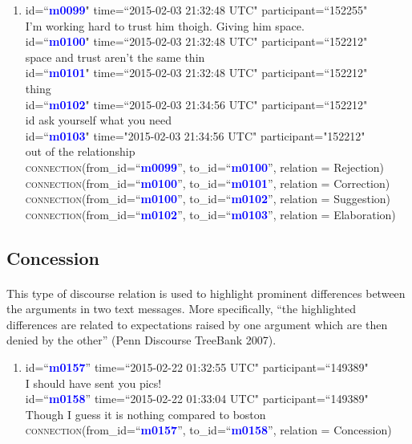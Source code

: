 \documentclass{article}
\begin{document}
\begin{enumerate}[resume]
\item id=``\textbf{\textcolor{blue}{m0099}}" time=``2015-02-03 21:32:48 UTC" participant=``152255"\\
I'm working hard to trust him thoigh. Giving him space. \\
id=``\textbf{\textcolor{blue}{m0100}}" time=``2015-02-03 21:32:48 UTC" participant=``152212" \\
space and trust aren’t the same thin \\
id=``\textbf{\textcolor{blue}{m0101}}" time=``2015-02-03 21:32:48 UTC" participant=``152212" \\
thing \\
id=``\textbf{\textcolor{blue}{m0102}}" time=``2015-02-03 21:34:56 UTC" participant=``152212" \\
id ask yourself what you need\\
id=``\textbf{\textcolor{blue}{m0103}}" time="2015-02-03 21:34:56 UTC" participant="152212"\\
out of the relationship\\
\textsc{connection}(from\_id=``\textbf{\textcolor{blue}{m0099}}'', to\_id=``\textbf{\textcolor{blue}{m0100}}'', relation = Rejection)\\
\textsc{connection}(from\_id=``\textbf{\textcolor{blue}{m0100}}'', to\_id=``\textbf{\textcolor{blue}{m0101}}'', relation = Correction)\\
\textsc{connection}(from\_id=``\textbf{\textcolor{blue}{m0100}}'', to\_id=``\textbf{\textcolor{blue}{m0102}}'', relation = Suggestion)\\
\textsc{connection}(from\_id=``\textbf{\textcolor{blue}{m0102}}'', to\_id=``\textbf{\textcolor{blue}{m0103}}'', relation = Elaboration)
\end{enumerate}

\subsection{Concession}
\paragraph{}
This type of discourse relation is used to highlight prominent differences between the arguments in two text messages. More specifically, ``the highlighted differences are related to expectations raised by one argument which are then denied by the other'' (Penn Discourse TreeBank 2007).
\begin{enumerate}[resume]
\item id=``\textbf{\textcolor{blue}{m0157}}'' time=``2015-02-22 01:32:55 UTC" participant=``149389"\\
I should have sent you pics!\\
id=``\textbf{\textcolor{blue}{m0158}}'' time=``2015-02-22 01:33:04 UTC" participant=``149389"\\
Though I guess it is nothing compared to boston \\
\textsc{connection}(from\_id=``\textbf{\textcolor{blue}{m0157}}'', to\_id=``\textbf{\textcolor{blue}{m0158}}'', relation = Concession)\\
\end{enumerate}
\end{document}
